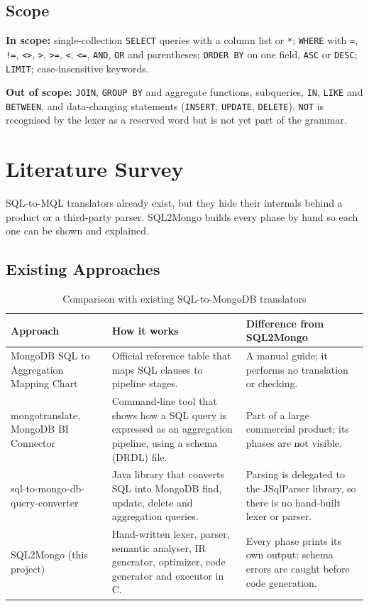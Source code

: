 \documentclass[12pt,a4paper]{report}
\newcommand{\codeus}{\textunderscore\allowbreak}
\DeclareRobustCommand{\code}[1]{\texttt{\let\_\codeus #1}}
\begin{document}
\section{Scope}
\textbf{In scope:} single-collection \code{SELECT} queries with a column list or \code{*}; \code{WHERE} with \code{=}, \code{!=}, \code{<>}, \code{>}, \code{>=}, \code{<}, \code{<=}, \code{AND}, \code{OR} and parentheses; \code{ORDER BY} on one field, \code{ASC} or \code{DESC}; \code{LIMIT}; case-insensitive keywords.

\textbf{Out of scope:} \code{JOIN}, \code{GROUP BY} and aggregate functions, subqueries, \code{IN}, \code{LIKE} and \code{BETWEEN}, and data-changing statements (\code{INSERT}, \code{UPDATE}, \code{DELETE}). \code{NOT} is recognised by the lexer as a reserved word but is not yet part of the grammar.

\chapter{Literature Survey}
SQL-to-MQL translators already exist, but they hide their internals behind a product or a third-party parser. SQL2Mongo builds every phase by hand so each one can be shown and explained.

\section{Existing Approaches}
\begin{table}[H]
\centering\small
\begin{tabularx}{\linewidth}{|P{3.4cm}|L|L|}
\hline
\textbf{Approach} & \textbf{How it works} & \textbf{Difference from SQL2Mongo} \\ \hline
MongoDB SQL to Aggregation Mapping Chart \cite{mongo-chart} & Official reference table that maps SQL clauses to pipeline stages. & A manual guide; it performs no translation or checking. \\ \hline
mongotranslate, MongoDB BI Connector \cite{mongotranslate} & Command-line tool that shows how a SQL query is expressed as an aggregation pipeline, using a schema (DRDL) file. & Part of a large commercial product; its phases are not visible. \\ \hline
sql-to-mongo-db-query-converter \cite{russell} & Java library that converts SQL into MongoDB find, update, delete and aggregation queries. & Parsing is delegated to the JSqlParser library, so there is no hand-built lexer or parser. \\ \hline
SQL2Mongo (this project) & Hand-written lexer, parser, semantic analyser, IR generator, optimizer, code generator and executor in C. & Every phase prints its own output; schema errors are caught before code generation. \\ \hline
\end{tabularx}
\caption{Comparison with existing SQL-to-MongoDB translators}
\end{table}
\end{document}
